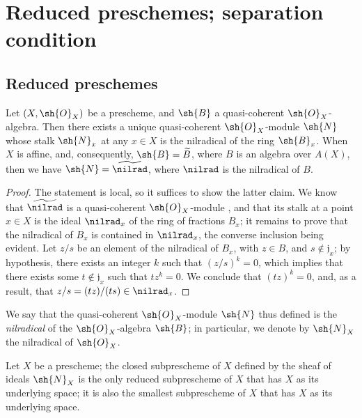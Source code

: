 \section{Reduced preschemes; separation condition}
\label{section:I.5}

\subsection{Reduced preschemes}
\label{subsection:I.5.1}

\begin{proposition}[5.1.1]
\label{I.5.1.1}
Let $(X,\sh{O}_X)$ be a prescheme, and $\sh{B}$ a quasi-coherent $\sh{O}_X$-algebra.
Then there exists a unique quasi-coherent $\sh{O}_X$-module $\sh{N}$ whose stalk $\sh{N}_x$ at any $x\in X$ is the nilradical of the ring $\sh{B}_x$.
When $X$ is affine, and, consequently, $\sh{B}=\widetilde{B}$, where $B$ is an algebra over $A(X)$, then we have $\sh{N}=\widetilde{\nilrad}$, where $\nilrad$ is the nilradical of $B$.
\end{proposition}

\begin{proof}
The statement is local, so it suffices to show the latter claim.
We know that $\widetilde{\nilrad}$ is a quasi-coherent $\sh{O}_X$-module , and that its stalk at a point $x\in X$ is the ideal $\nilrad_x$ of the ring of fractions $B_x$;
it remains to prove that the nilradical of $B_x$ is contained in $\nilrad_x$, the converse inclusion being evident.
Let $z/s$ be an element of the nilradical of $B_x$, with $z\in B$, and $s\not\in\mathfrak{j}_x$;
by hypothesis, there exists an integer $k$ such that $(z/s)^k=0$, which implies that there exists some $t\not\in\mathfrak{j}_x$ such that $tz^k=0$.
We conclude that $(tz)^k=0$, and, as a result, that $z/s=(tz)/(ts)\in\nilrad_x$.
\end{proof}

We say that the quasi-coherent $\sh{O}_X$-module $\sh{N}$ thus defined is the \emph{nilradical} of the $\sh{O}_X$-algebra $\sh{B}$; in particular, we denote by $\sh{N}_X$ the nilradical of $\sh{O}_X$.

\begin{corollary}[5.1.2]
\label{I.5.1.2}
Let $X$ be a prescheme;
the closed subprescheme of $X$ defined by the sheaf of ideals $\sh{N}_X$ is the only reduced subprescheme  of $X$ that has $X$ as its underlying space;
it is also the smallest subprescheme of $X$ that has $X$ as its underlying space.
\end{corollary}

